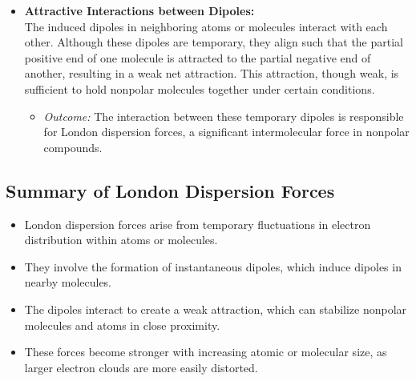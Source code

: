 \documentclass{report}
\begin{document}
\begin{itemize}
	\item \textbf{Attractive Interactions between Dipoles:} \\
	      The induced dipoles in neighboring atoms or molecules interact with each other. Although these dipoles are temporary, they align such that the partial positive end of one molecule is attracted to the partial negative end of another, resulting in a weak net attraction. This attraction, though weak, is sufficient to hold nonpolar molecules together under certain conditions.

	      \begin{itemize}
		      \item \textit{Outcome:} The interaction between these temporary dipoles is responsible for London dispersion forces, a significant intermolecular force in nonpolar compounds.
	      \end{itemize}
\end{itemize}

\subsection{Summary of London Dispersion Forces}

\begin{itemize}
	\item London dispersion forces arise from temporary fluctuations in electron distribution within atoms or molecules.
	\item They involve the formation of instantaneous dipoles, which induce dipoles in nearby molecules.
	\item The dipoles interact to create a weak attraction, which can stabilize nonpolar molecules and atoms in close proximity.
	\item These forces become stronger with increasing atomic or molecular size, as larger electron clouds are more easily distorted.
\end{itemize}
\end{document}
